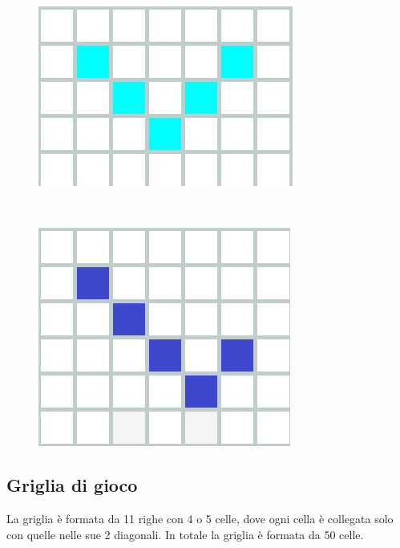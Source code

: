 \begin{figure}[h]
	\centering
	\begin{minipage}{3.5cm}
		\centering
		\includegraphics[scale=0.25]{immagini/v}
		\caption{}
		\label{v}
	\end{minipage}
	\ \hspace{2mm} \hspace{3mm} \
	\begin{minipage}{3.5cm}
		\centering
		\includegraphics[scale=0.30]{immagini/L}
		\caption{}
		\label{l}
	\end{minipage}
\end{figure}

\newpage
\subsection{Griglia di gioco}
La griglia è formata da 11 righe con 4 o 5 celle, dove ogni cella è collegata solo con quelle nelle sue 2 diagonali. In totale la griglia è formata da 50 celle.

